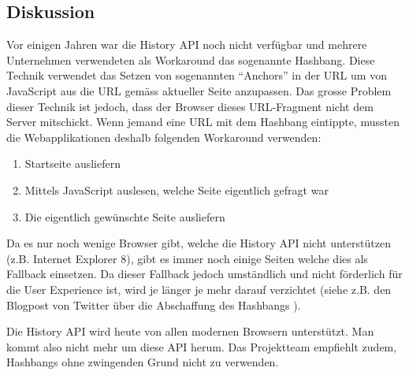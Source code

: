 \subsection*{Diskussion}
Vor einigen Jahren war die History API noch nicht verfügbar und mehrere Unternehmen verwendeten als Workaround das sogenannte \gls{Hashbang}. Diese Technik verwendet das Setzen von sogenannten ``Anchors'' in der URL um von JavaScript aus die \gls{URL} gemäss aktueller Seite anzupassen. Das grosse Problem dieser Technik ist jedoch, dass der Browser dieses \gls{URL}-Fragment nicht dem Server mitschickt.
Wenn jemand eine \gls{URL} mit dem \gls{Hashbang} eintippte, mussten die Webapplikationen deshalb folgenden Workaround verwenden:

\begin{enumerate}
	\item Startseite ausliefern
	\item Mittels JavaScript auslesen, welche Seite eigentlich gefragt war
	\item Die eigentlich gewünschte Seite ausliefern
\end{enumerate}

Da es nur noch wenige Browser gibt, welche die History API nicht unterstützen (z.B. Internet Explorer 8), gibt es immer noch einige Seiten welche dies als Fallback einsetzen. Da dieser Fallback jedoch umständlich und nicht förderlich für die User Experience ist, wird je länger je mehr darauf verzichtet (siehe z.B. den Blogpost von Twitter über die Abschaffung des Hashbangs \cite{twitterAbandonsHashbangs}).

Die History API wird heute von allen modernen Browsern unterstützt. Man kommt also nicht mehr um diese API herum. Das Projektteam
empfiehlt zudem, Hashbangs ohne zwingenden Grund nicht zu verwenden.